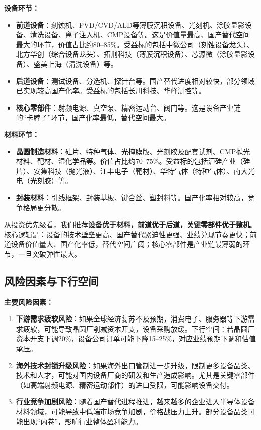 \textbf{设备环节：}
\begin{itemize}[leftmargin=2em]
\item \textbf{前道设备}：刻蚀机、PVD/CVD/ALD等薄膜沉积设备、光刻机、涂胶显影设备、清洗设备、离子注入机、CMP设备等。这是价值量最高、国产替代空间最大的环节，价值占比约80--85\%。受益标的包括中微公司（刻蚀设备龙头）、北方华创（综合设备龙头）、拓荆科技（薄膜沉积设备）、芯源微（涂胶显影设备）、盛美上海（清洗设备）等。
\item \textbf{后道设备}：测试设备、分选机、探针台等。国产替代进度相对较快，部分领域已实现较高国产化率。受益标的包括长川科技、华峰测控等。
\item \textbf{核心零部件}：射频电源、真空泵、精密运动台、阀门等。这是设备产业链的“卡脖子”环节，国产化率最低，替代空间最大。
\end{itemize}

\textbf{材料环节：}
\begin{itemize}[leftmargin=2em]
\item \textbf{晶圆制造材料}：硅片、特种气体、光掩膜版、光刻胶及配套试剂、CMP抛光材料、靶材、湿化学品等。价值占比约70--75\%。受益标的包括沪硅产业（硅片）、安集科技（抛光液）、江丰电子（靶材）、华特气体（特种气体）、南大光电（光刻胶）等。
\item \textbf{封装材料}：引线框架、封装基板、键合丝、塑封料等。国产化率相对较高，竞争格局更分散。
\end{itemize}

从投资优先级看，我们推荐\textbf{设备优于材料，前道优于后道，关键零部件优于整机}。核心逻辑是：设备的技术壁垒更高、国产替代紧迫性更强、业绩兑现节奏更快；前道设备价值量大、国产化率低，替代空间广阔；核心零部件是产业链最薄弱的环节，一旦突破弹性最大。

\subsection{风险因素与下行空间}

\textbf{主要风险因素：}

\begin{enumerate}[leftmargin=2em]
\item \textbf{下游需求疲软风险}：如果全球经济复苏不及预期，消费电子、服务器等下游需求疲软，可能导致晶圆厂削减资本开支，设备采购放缓。下行空间：若晶圆厂资本开支下调20\%，设备公司订单可能下降15--25\%，对应业绩预期下调和估值承压。

\item \textbf{海外技术封锁升级风险}：如果海外出口管制进一步升级，限制更多设备品类、技术和人才，可能对国内设备厂商的研发和生产造成影响。尤其是关键零部件（如高端射频电源、精密运动部件）的进口受限，可能影响设备交付。

\item \textbf{行业竞争加剧风险}：随着国产替代进程推进，越来越多的企业进入半导体设备材料领域，可能导致中低端市场竞争加剧，价格战压力上升。部分设备品类可能出现“内卷”，影响行业整体盈利能力。
\end{enumerate}

